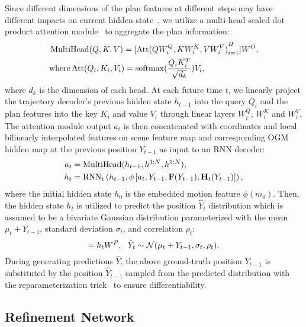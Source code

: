 \documentclass[10pt,twocolumn,letterpaper]{article}
\begin{document}
 Since different dimensions of the plan features at different steps may have different impacts on current hidden state~\cite{mercat2020multi}, we utilize a multi-head scaled dot product attention module~\cite{vaswani2017attention} to aggregate the plan information:
\begin{equation}
\begin{aligned}
&\operatorname{MultiHead}(Q,K,V)=[{\operatorname{Att}(QW_i^Q,KW_i^K,VW_i^V)}_{i=1}^H]W^O,\\
&\text{where} \operatorname{Att}(Q_i,K_i,V_i)=\operatorname{softmax}(\frac{Q_iK_i^T}{\sqrt{d_k}})V_i,\notag
\end{aligned}
\end{equation}
where $d_k$ is the dimension of each head. At each future time $t$, we linearly project the trajectory decoder's previous hidden state $h_{t-1}$ into the query $Q_i$ and the plan features into the key $K_i$ and value $V_i$ through linear layers $W_i^Q$, $W_i^K$ and $W_i^V$. The attention module output $a_t$ is then concatenated with coordinates and local bilinearly interpolated features on scene feature map and corresponding OGM hidden map at the previous position $Y_{t-1}$ as input to an RNN decoder:
\begin{equation}
\begin{aligned}
a_t&=\operatorname{MultiHead}(h_{t-1},h^{1:N},h^{1:N}),\\
h_t&=\operatorname{RNN_t}\left(h_{t-1}, \phi\left[a_t,Y_{t-1},\mathbf{F}(Y_{t-1}),\mathbf{H}_t(Y_{t-1})\right]\right), \notag
\end{aligned}
\end{equation}
where the initial hidden state $h_0$ is the embedded motion feature $\phi(m_0)$. Then, the hidden state $h_t$ is utilized to predict the position $\hat{Y}_t$ distribution which is assumed to be a bivariate Gaussian distribution parameterized with the mean $\mu_t+Y_{t-1}$, standard deviation $\sigma_t$, and correlation $\rho_t$:
\begin{equation}
    [\mu_t,\sigma_t,\rho_t]=h_tW^P,~~\hat{Y}_t \sim \mathcal{N}(\mu_t+Y_{t-1},\sigma_t,\rho_t). \notag
\end{equation}
During generating predictions $\hat{Y}$, the above ground-truth position $Y_{t-1}$ is substituted by the position $\hat{Y}_{t-1}$ sampled from the predicted distribution with the reparameterization trick~\cite{Kingma2014Auto} to ensure differentiability.

\subsection{Refinement Network}
\end{document}
